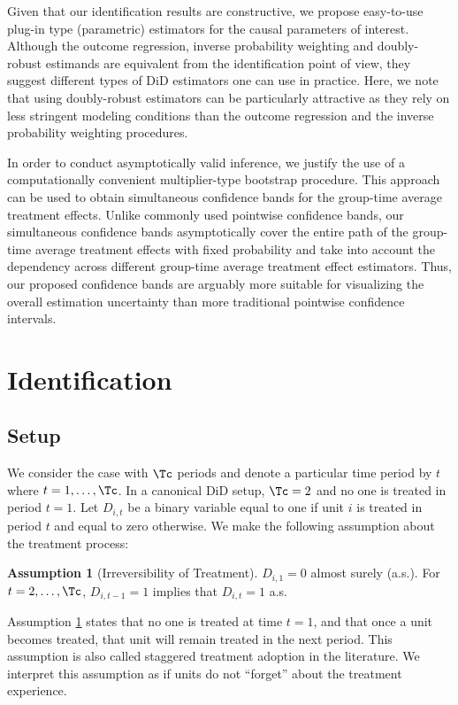\documentclass[12pt]{article}
\theoremstyle{definition}
\newtheorem{assumption}{Assumption}
\begin{document}
Given that our identification results are constructive, we propose easy-to-use plug-in type (parametric) estimators for the causal parameters of interest. Although the outcome regression, inverse probability weighting and doubly-robust estimands are equivalent from the identification point of view, they suggest different types of DiD estimators one can use in practice. Here, we note that using doubly-robust estimators can be particularly attractive as they rely on less stringent modeling conditions than the outcome regression and the inverse probability weighting procedures.

In order to conduct asymptotically valid inference, we justify the use of a computationally convenient multiplier-type bootstrap procedure. This approach can be used to obtain simultaneous confidence bands for the group-time average treatment effects. Unlike commonly used pointwise confidence bands, our simultaneous confidence bands asymptotically cover the entire path of the group-time average treatment effects with fixed probability and take into account the dependency across different group-time average treatment effect estimators. Thus, our proposed confidence bands are arguably more suitable for visualizing the overall estimation uncertainty than more traditional pointwise confidence intervals.

\section{Identification}

\subsection{Setup}

We consider the case with $\Tc$ periods and denote a particular time period by $t$ where $t = 1, \ldots, \Tc$. In a canonical DiD setup, $\Tc = 2$ and no one is treated in period $t=1$. Let $D_{i,t}$ be a binary variable equal to one if unit $i$ is treated in period $t$ and equal to zero otherwise. We make the following assumption about the treatment process:

\begin{assumption}[Irreversibility of Treatment] \label{IT}
    $D_{i, 1} = 0$ almost surely (a.s.). For $t = 2, \ldots, \Tc$, $D_{i, t-1} = 1$ implies that $D_{i,t} = 1$ a.s.
\end{assumption}

Assumption \ref{IT} states that no one is treated at time $t = 1$, and that once a unit becomes treated, that unit will remain treated in the next period. This assumption is also called staggered treatment adoption in the literature. We interpret this assumption as if units do not ``forget'' about the treatment experience.
\end{document}
